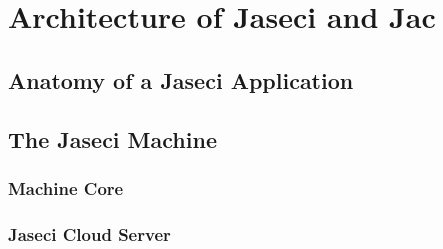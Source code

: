 \chapter{Architecture of Jaseci and Jac}
\minitoc
\section{Anatomy of a Jaseci Application}
\section{The Jaseci Machine}
\subsection{Machine Core}
\subsection{Jaseci Cloud Server}